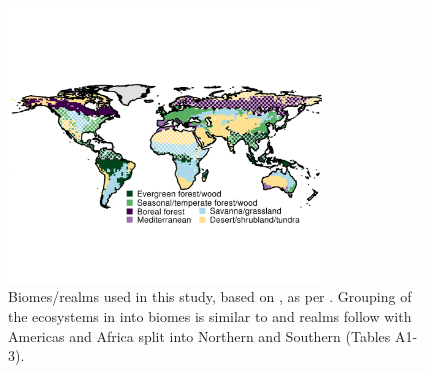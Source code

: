 \documentclass[bg, manuscript]{copernicus}
\begin{document}
\subsection{}     %


\noappendix       %




\appendixfigures  %
\begin{figure}[t]
\includegraphics[width=8.3cm]{figs/biomeMap.png}
\caption{Biomes/realms used in this study, based on \citet{Olson2001-gv}, as per \citet{Sellar2019-bo}. Grouping of the ecosystems in\citet{Olson2001-gv} into biomes is similar to \citet{Kelley2019-yu} and realms follow \citet{Olson2001-gv} with Americas and Africa split into Northern and Southern (Tables A1-3).
 \label{fig:regionsMap}}
\end{figure}
\end{document}
